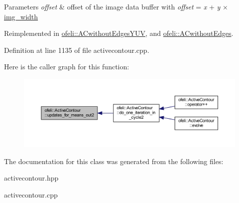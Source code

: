 \begin{DoxyParams}{Parameters}
{\em offset} & offset of the image data buffer with {\itshape offset} = {\itshape x} + {\itshape y} × \hyperlink{classofeli_1_1_active_contour_a3623de7ebc0d27ba7fac21a5929afbc6}{img\-\_\-width} \\
\hline
\end{DoxyParams}


Reimplemented in \hyperlink{classofeli_1_1_a_cwithout_edges_y_u_v_a43b463f3b8d5cb9604fd73b18083409a}{ofeli\-::\-A\-Cwithout\-Edges\-Y\-U\-V}, and \hyperlink{classofeli_1_1_a_cwithout_edges_a80021d0ca688f3cbf46bccc870706e4c}{ofeli\-::\-A\-Cwithout\-Edges}.



Definition at line 1135 of file activecontour.\-cpp.



Here is the caller graph for this function\-:\nopagebreak
\begin{figure}[H]
\begin{center}
\leavevmode
\includegraphics[width=350pt]{classofeli_1_1_active_contour_a347e650493750ad29b8b73ed52bdcf7a_icgraph}
\end{center}
\end{figure}




The documentation for this class was generated from the following files\-:\begin{DoxyCompactItemize}
\item 
activecontour.\-hpp\item 
activecontour.\-cpp\end{DoxyCompactItemize}
